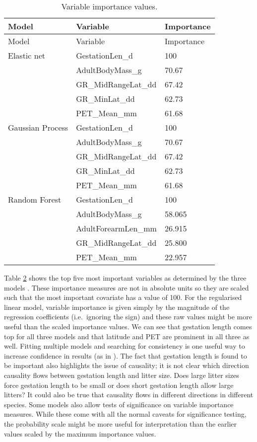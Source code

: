 \documentclass[10pt,]{article}
\begin{document}
\begin{table}[t!]
\begin{longtable}[c]{@{}lll@{}}
\caption{Variable importance values. \label{tbl:varimp}}\tabularnewline
\toprule
Model & Variable & Importance\tabularnewline
\midrule
\endfirsthead
\toprule
Model & Variable & Importance\tabularnewline
\midrule
\endhead
Elastic net & GestationLen\_d & 100\tabularnewline
& AdultBodyMass\_g & 70.67\tabularnewline
& GR\_MidRangeLat\_dd & 67.42\tabularnewline
& GR\_MinLat\_dd & 62.73\tabularnewline
& PET\_Mean\_mm & 61.68\tabularnewline
Gaussian Process & GestationLen\_d & 100\tabularnewline
& AdultBodyMass\_g & 70.67\tabularnewline
& GR\_MidRangeLat\_dd & 67.42\tabularnewline
& GR\_MinLat\_dd & 62.73\tabularnewline
& PET\_Mean\_mm & 61.68\tabularnewline
Random Forest & GestationLen\_d & 100\tabularnewline
& AdultBodyMass\_g & 58.065\tabularnewline
& AdultForearmLen\_mm & 26.915\tabularnewline
& GR\_MidRangeLat\_dd & 25.800\tabularnewline
& PET\_Mean\_mm & 22.957\tabularnewline
\bottomrule
\end{longtable}
\end{table}

Table \ref{tbl:varimp} shows the top five most important variables as determined by the three models \citep{oppel2009alternative}.
These importance measures are not in absolute units so they are scaled such that the most important covariate has a value of 100.
For the regularised linear model, variable importance is given simply by the magnitude of the regression coefficients (i.e.~ignoring the sign) and these raw values might be more useful than the scaled importance values.
We can see that gestation length comes top for all three models and that latitude and PET are prominent in all three as well.
Fitting multiple models and searching for consistency is one useful way to increase confidence in results (as in \citet{appelhans2015evaluating}).
The fact that gestation length is found to be important also highlights the issue of causality; it is not clear which direction causality flows between gestation length and litter size.
Does large litter sizes force gestation length to be small or does short gestation length allow large litters? It could also be true that causality flows in different directions in different species.
Some models also allow tests of significance on variable importance measures.
While these come with all the normal caveats for significance testing, the probability scale might be more useful for interpretation than the earlier values scaled by the maximum importance values.
\end{document}
